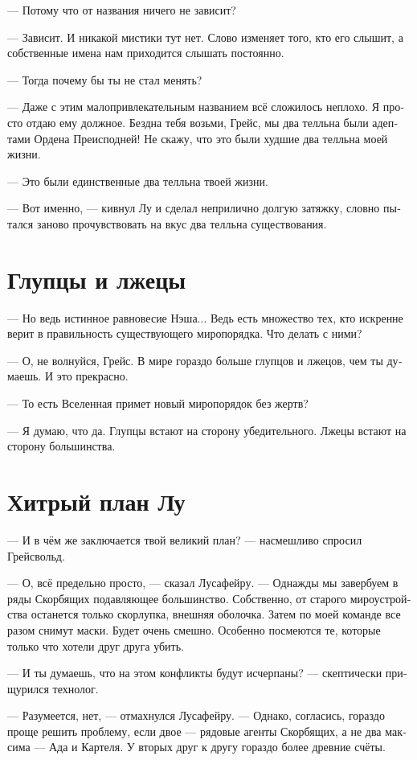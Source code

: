 \documentclass[a4paper,12pt,fleqn]{book}\usepackage{polyglossia}\setdefaultlanguage[babelshorthands=true]{russian}\setotherlanguage{english}\defaultfontfeatures{Ligatures=TeX,Mapping=tex-text}\usepackage{xcolor}\newcommand{\ml}[3]{#2}
\begin{document}
{--- Потому что от названия ничего не зависит?

--- Зависит.
И никакой мистики тут нет.
Слово изменяет того, кто его слышит, а собственные имена нам приходится слышать постоянно.

--- Тогда почему бы ты не стал менять?

--- Даже с этим малопривлекательным названием всё сложилось неплохо.
Я просто отдаю ему должное.
Бездна тебя возьми, Грейс, мы два телльна были адептами Ордена Преисподней!
Не скажу, что это были худшие два телльна моей жизни.

--- Это были единственные два телльна твоей жизни.

--- Вот именно, --- кивнул Лу и сделал неприлично долгую затяжку, словно пытался заново прочувствовать на вкус два телльна существования.

\section{Глупцы и лжецы}

--- Но ведь истинное равновесие Нэша...
Ведь есть множество тех, кто искренне верит в правильность существующего миропорядка.
Что делать с ними?

--- О, не волнуйся, Грейс.
В мире гораздо больше глупцов и лжецов, чем ты думаешь.
И это прекрасно.

--- То есть Вселенная примет новый миропорядок без жертв?

--- Я думаю, что да.
Глупцы встают на сторону убедительного.
Лжецы встают на сторону большинства.

\section{Хитрый план Лу}

--- И в чём же заключается твой великий план? --- насмешливо спросил Грейсвольд.

--- О, всё предельно просто, --- сказал Лусафейру.
--- Однажды мы завербуем в ряды Скорбящих подавляющее большинство.
Собственно, от старого мироустройства останется только скорлупка, внешняя оболочка.
Затем по моей команде все разом снимут маски.
Будет очень смешно.
Особенно посмеются те, которые только что хотели друг друга убить.

--- И ты думаешь, что на этом конфликты будут исчерпаны? --- скептически прищурился технолог.

--- Разумеется, нет, --- отмахнулся Лусафейру.
--- Однако, согласись, гораздо проще решить проблему, если двое --- рядовые агенты Скорбящих, а не два максима --- Ада и Картеля.
У вторых друг к другу гораздо более древние счёты.

}
\end{document}
